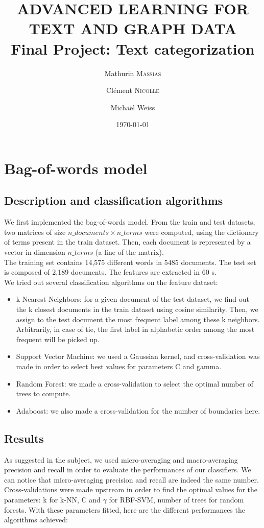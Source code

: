\documentclass[11pt,a4paper]{article}
\title{ADVANCED LEARNING FOR TEXT AND GRAPH DATA \\ Final Project: Text categorization}
\author{Mathurin \textsc{Massias} \and Clément \textsc{Nicolle} \and Michaël Weiss}
\date{\today}
\begin{document}
	
\maketitle

\section{Bag-of-words model}

\subsection{Description and classification algorithms}

We first implemented the bag-of-words model. From the train and test datasets, two matrices of size $n\_documents \times n\_terms$ were computed, using the dictionary of terms present in the train dataset. Then, each document is represented by a vector in dimension $n\_terms$ (a line of the matrix).
\\The training set contains 14,575 different words in 5485 documents. The test set is composed of 2,189 documents. The features are extracted in 60 s.
\\We tried out several classification algorithms on the feature dataset:
\begin{itemize}
	\item k-Nearest Neighbors: for a given document of the test dataset, we find out the k closest documents in the train dataset using cosine similarity. Then, we assign to the test document the most frequent label among these k neighbors. Arbitrarily, in case of tie, the first label in alphabetic order among the most frequent will be picked up.
	\item Support Vector Machine: we used a Gaussian kernel, and cross-validation was made in order to select best values for parameters C and gamma.
	\item Random Forest: we made a cross-validation to select the optimal number of trees to compute.
	\item Adaboost: we also made a cross-validation for the number of boundaries here.
\end{itemize}


\subsection{Results}

As suggested in the subject, we used micro-averaging and macro-averaging precision and recall in order to evaluate the performances of our classifiers. We can notice that micro-averaging precision and recall are indeed the same number.
\\Cross-validations were made upstream in order to find the optimal values for the parameters: k for k-NN, C and $\gamma$ for RBF-SVM, number of trees for random forests. With these parameters fitted, here are the different performances the algorithms achieved:
\end{document}
